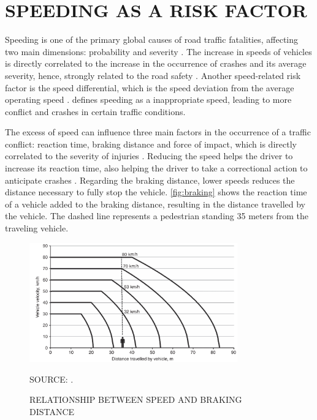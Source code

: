 \section{SPEEDING AS A RISK FACTOR} \label{speeding}

Speeding is one of the primary global causes of road traffic fatalities, affecting two main dimensions: probability and severity \cite{WHO2013}. The increase in speeds of vehicles is directly correlated to the increase in the occurrence of crashes and its average severity, hence, strongly related to the road safety \cite{Mohan2016a}. Another speed-related risk factor is the speed differential, which is the speed deviation from the average operating speed \cite{Shinar2017}. \textcite{Ferraz2012} defines speeding as a inappropriate speed, leading to more conflict and crashes in certain traffic conditions. 

The excess of speed can influence three main factors in the occurrence of a traffic conflict: reaction time, braking distance and force of impact, which is directly correlated to the severity of injuries \cite{Mohan2016a}. Reducing the speed helps the driver to increase its reaction time, also helping the driver to take a correctional action to anticipate crashes \cite{Elvik2009}. Regarding the braking distance, lower speeds reduces the distance necessary to fully stop the vehicle. \autoref{fig:braking} shows the reaction time of a vehicle added to the braking distance, resulting in the distance travelled by the vehicle. The dashed line represents a pedestrian standing 35 meters from the traveling vehicle. 

\begin{figure}[!htbp]
    \centering\footnotesize
    \captionsetup{font=footnotesize}
    \caption{RELATIONSHIP BETWEEN SPEED AND BRAKING DISTANCE}
    \includegraphics[width=0.8\textwidth]{fig/braking2.png}
    \label{fig:braking}
    \par SOURCE: \textcite{Mohan2016a}.
\end{figure} 

